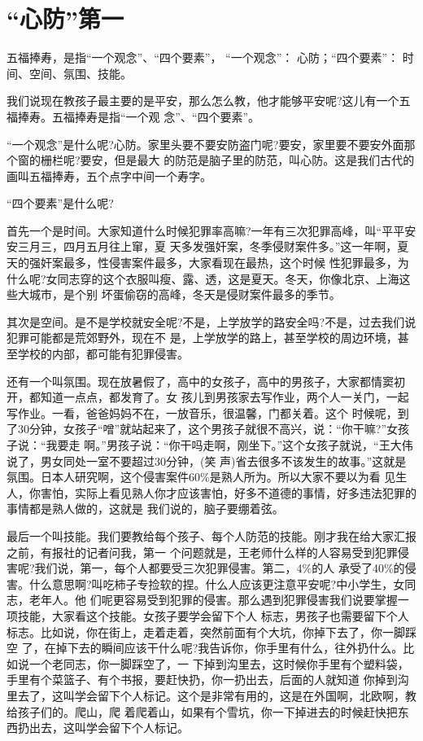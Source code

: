 \documentclass[11pt,a4paper,onecolumn]{article}
\begin{document}
\section{``心防''第一}

五福捧寿，是指``一个观念''、``四个要素''， ``一个观念''： 心防；``四个要素''： 时间、空间、氛围、技能。

我们说现在教孩子最主要的是平安，那么怎么教，他才能够平安呢?这儿有一个五福捧寿。五福捧寿是指``一个观
念''、``四个要素''。

``一个观念''是什么呢?心防。家里头要不要安防盗门呢?要安，家里要不要安外面那个窗的栅栏呢?要安，但是最大
的防范是脑子里的防范，叫心防。这是我们古代的画叫五福捧寿，五个点字中间一个寿字。

``四个要素''是什么呢?

首先一个是时间。大家知道什么时候犯罪率高嘛?一年有三次犯罪高峰，叫``平平安安三月三，四月五月往上窜，夏
天多发强奸案，冬季侵财案件多。''这一年啊，夏天的强奸案最多，性侵害案件最多，大家看现在最热，这个时候
性犯罪最多，为什么呢?女同志穿的这个衣服叫瘦、露、透，这是夏天。冬天，你像北京、上海这些大城市，是个别
坏蛋偷窃的高峰，冬天是侵财案件最多的季节。

其次是空间。是不是学校就安全呢?不是，上学放学的路安全吗?不是，过去我们说犯罪可能都是荒郊野外，现在不
是，上学放学的路上，甚至学校的周边环境，甚至学校的内部，都可能有犯罪侵害。

还有一个叫氛围。现在放暑假了，高中的女孩子，高中的男孩子，大家都情窦初开，都知道一点点，都发育了。女
孩儿到男孩家去写作业，两个人一关门，一起写作业。一看，爸爸妈妈不在，一放音乐，很温馨，门都关着。这个
时候呢，到了30分钟，女孩子``噌''就站起来了，这个男孩子就很不高兴，说：``你干嘛?''女孩子说：``我要走
啊。''男孩子说：``你干吗走啊，刚坐下。''这个女孩子就说，``王大伟说了，男女同处一室不要超过30分钟，(笑
声)省去很多不该发生的故事。''这就是氛围。日本人研究啊，这个侵害案件60\%是熟人所为。所以大家不要以为看
见生人，你害怕，实际上看见熟人你才应该害怕，好多不道德的事情，好多违法犯罪的事情都是熟人做的，这就是
我们说的，脑子要绷着弦。

最后一个叫技能。我们要教给每个孩子、每个人防范的技能。刚才我在给大家汇报之前，有报社的记者问我，第一
个问题就是，王老师什么样的人容易受到犯罪侵害呢?我们说，第一，每个人都要受三次犯罪侵害。第二，4\%的人
承受了40\%的侵害。什么意思啊?叫吃柿子专捡软的捏。什么人应该更注意平安呢?中小学生，女同志，老年人。他
们呢更容易受到犯罪的侵害。那么遇到犯罪侵害我们说要掌握一项技能，大家看这个技能。女孩子要学会留下个人
标志，男孩子也需要留下个人标志。比如说，你在街上，走着走着，突然前面有个大坑，你掉下去了，你一脚踩空
了，在掉下去的瞬间应该干什么呢?我告诉你，你手里有什么，往外扔什么。比如说一个老同志，你一脚踩空了，一
下掉到沟里去，这时候你手里有个塑料袋，手里有个菜篮子、有个书报，要赶快扔，你一扔出去，后面的人就知道
你掉到沟里去了，这叫学会留下个人标记。这个是非常有用的，这是在外国啊，北欧啊，教给孩子们的。爬山，爬
着爬着山，如果有个雪坑，你一下掉进去的时候赶快把东西扔出去，这叫学会留下个人标记。
\end{document}

